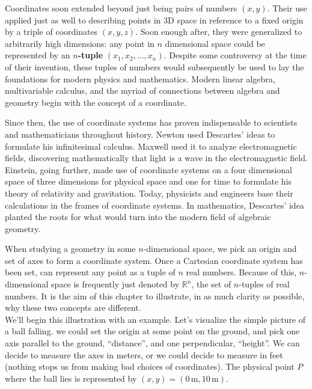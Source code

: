 \documentclass[../master.tex]{subfiles}
\begin{document}
	Coordinates soon extended beyond just being pairs of numbers $(x,y)$. Their use applied just as well to describing points in 3D space in reference to a fixed origin by a triple of coordinates $(x,y,z)$. Soon enough after, they were generalized to arbitrarily high dimensions: any point in $n$ dimensional space could be represented by an \textbf{$n$-tuple} $(x_1, x_2, \dots, x_n)$. Despite some controversy at the time of their invention, these tuples of numbers would subsequently be used to lay the foundations for modern physics and mathematics. Modern linear algebra, multivariable calculus, and the myriad of connections between algebra and geometry begin with the concept of a coordinate.
	
	Since then, the use of coordinate systems has proven indispensable to scientists and mathematicians throughout history. Newton used Descartes' ideas to formulate his infinitesimal calculus. Maxwell used it to analyze electromagnetic fields, discovering mathematically that light is a wave in the electromagnetic field. Einstein, going further, made use of coordinate systems on a four dimensional space of three dimensions for physical space and one for time to formulate his theory of relativity and gravitation. Today, physicists and engineers base their calculations in the frames of coordinate systems. In mathematics, Descartes' idea planted the roots for what would turn into the modern field of algebraic geometry. 
	
	When studying a geometry in some $n$-dimensional space, we pick an origin and set of axes to form a coordinate system. Once a Cartesian coordinate system has been set, can represent any point as a tuple of $n$ real numbers. Because of this, $n$-dimensional space is frequently just denoted by $\mathbb{R}^n$, the set of $n$-tuples of real numbers. It is the aim of this chapter to illustrate, in as much clarity as possible, why these two concepts are different. \\
	
	We'll begin this illustration with an example. Let's visualize the simple picture of a ball falling. we could set the origin at some point on the ground, and pick one axis parallel to the ground, ``distance'', and one perpendicular, ``height''. We can decide to measure the axes in meters, or we could decide to measure in feet (nothing stops us from making bad choices of coordinates). The physical point $P$ where the ball lies is represented by $(x,y)=(0\, \mathrm m,10\, \mathrm m)$.
	
\end{document}
